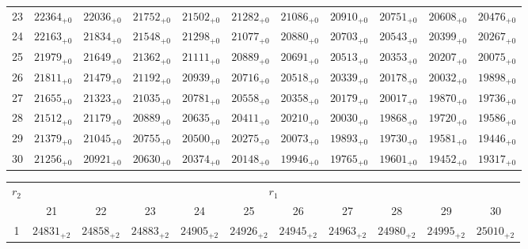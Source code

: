 \documentclass[10pt, a4paper]{article}
\begin{document}
\begin{center}
\begin{tabular}{c || c c c c c | c c c c c}
        23 & \({22364}_{+0}\) & \({22036}_{+0}\) & \({21752}_{+0}\) & \({21502}_{+0}\) & \({21282}_{+0}\) & \({21086}_{+0}\) & \({20910}_{+0}\) & \({20751}_{+0}\) & \({20608}_{+0}\) & \({20476}_{+0}\)\\
        24 & \({22163}_{+0}\) & \({21834}_{+0}\) & \({21548}_{+0}\) & \({21298}_{+0}\) & \({21077}_{+0}\) & \({20880}_{+0}\) & \({20703}_{+0}\) & \({20543}_{+0}\) & \({20399}_{+0}\) & \({20267}_{+0}\)\\
        25 & \({21979}_{+0}\) & \({21649}_{+0}\) & \({21362}_{+0}\) & \({21111}_{+0}\) & \({20889}_{+0}\) & \({20691}_{+0}\) & \({20513}_{+0}\) & \({20353}_{+0}\) & \({20207}_{+0}\) & \({20075}_{+0}\)\\
        \hline
        26 & \({21811}_{+0}\) & \({21479}_{+0}\) & \({21192}_{+0}\) & \({20939}_{+0}\) & \({20716}_{+0}\) & \({20518}_{+0}\) & \({20339}_{+0}\) & \({20178}_{+0}\) & \({20032}_{+0}\) & \({19898}_{+0}\)\\
        27 & \({21655}_{+0}\) & \({21323}_{+0}\) & \({21035}_{+0}\) & \({20781}_{+0}\) & \({20558}_{+0}\) & \({20358}_{+0}\) & \({20179}_{+0}\) & \({20017}_{+0}\) & \({19870}_{+0}\) & \({19736}_{+0}\)\\
        28 & \({21512}_{+0}\) & \({21179}_{+0}\) & \({20889}_{+0}\) & \({20635}_{+0}\) & \({20411}_{+0}\) & \({20210}_{+0}\) & \({20030}_{+0}\) & \({19868}_{+0}\) & \({19720}_{+0}\) & \({19586}_{+0}\)\\
        29 & \({21379}_{+0}\) & \({21045}_{+0}\) & \({20755}_{+0}\) & \({20500}_{+0}\) & \({20275}_{+0}\) & \({20073}_{+0}\) & \({19893}_{+0}\) & \({19730}_{+0}\) & \({19581}_{+0}\) & \({19446}_{+0}\)\\
        30 & \({21256}_{+0}\) & \({20921}_{+0}\) & \({20630}_{+0}\) & \({20374}_{+0}\) & \({20148}_{+0}\) & \({19946}_{+0}\) & \({19765}_{+0}\) & \({19601}_{+0}\) & \({19452}_{+0}\) & \({19317}_{+0}\)\\
        \hline
    \end{tabular}
    \pagebreak
    \begin{tabular}{c || c c c c c | c c c c c}
        \multirow{2}{*}{\(r_2\)} & \multicolumn{10}{c}{\(r_1\)} \\
        & 21 & 22 & 23 & 24 & 25 & 26 & 27 & 28 & 29 & 30\\
        \hline\hline
        1 & \({24831}_{+2}\) & \({24858}_{+2}\) & \({24883}_{+2}\) & \({24905}_{+2}\) & \({24926}_{+2}\) & \({24945}_{+2}\) & \({24963}_{+2}\) & \({24980}_{+2}\) & \({24995}_{+2}\) & \({25010}_{+2}\)\\

\end{tabular}
\end{center}
\end{document}
